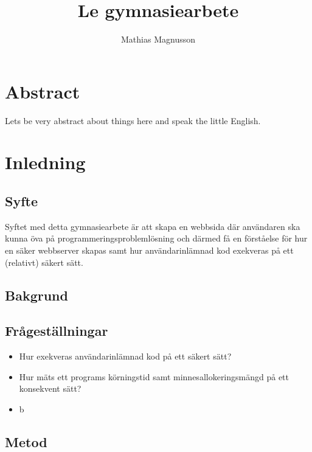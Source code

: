 \documentclass{article}
\author{Mathias Magnusson}
\title{Le gymnasiearbete}
\date{}
\begin{document}
\maketitle{}

\section*{Abstract}

Lets be very abstract about things here and speak the little English.

\clearpage

\tableofcontents

\clearpage

\section{Inledning}

\subsection{Syfte}

Syftet med detta gymnasiearbete är att skapa en webbsida där användaren ska
kunna öva på programmeringsproblemlösning och därmed få en förståelse för hur
en säker webbserver skapas samt hur användarinlämnad kod exekveras på ett
(relativt) säkert sätt.

\subsection{Bakgrund}

\subsection{Frågeställningar}

\begin{itemize}
	\item Hur exekveras användarinlämnad kod på ett säkert sätt?
	\item
		Hur mäts ett programs körningstid samt minnesallokeringsmängd på ett
		konsekvent sätt?
	\item b

\end{itemize}

\subsubsection{}

\subsection{Metod}
\end{document}
